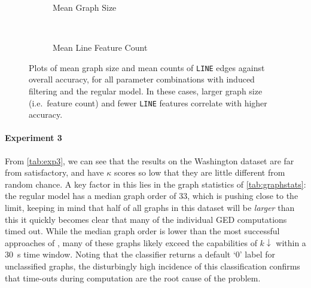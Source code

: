 \documentclass{mpaper}
\begin{document}
\begin{figure}
	\centering	
	
	\begin{subfigure}[t]{0.45\linewidth}
		
		\caption{Mean Graph Size}
	\end{subfigure}
	~
	\begin{subfigure}[t]{0.45\linewidth}
		
		\caption{Mean Line Feature Count}
	\end{subfigure}
	
	\vspace{0.5em}
	\caption{
		Plots of mean graph size and mean counts of \texttt{LINE} edges against overall accuracy, for all parameter combinations with induced filtering and the regular model.
		In these cases, larger graph size (i.e.\ feature count) and fewer \texttt{LINE} features correlate with higher accuracy.
		\label{fig:acc-vs-graphstat}
	}
\end{figure}

\paragraph{Experiment 3}
From \cref{tab:exp3}, we can see that the results on the Washington dataset are far from satisfactory, and have $\kappa$ scores so low that they are little different from random chance.
A key factor in this lies in the graph statistics of \cref{tab:graphstats}: the regular model has a median graph order of 33, which is pushing close to the limit, keeping in mind that half of all graphs in this dataset will be \emph{larger} than this it quickly becomes clear that many of the individual GED computations timed out.
While the median graph order is lower than the most successful approaches of \citeauthor{Graphs-Handwriting}, many of these graphs likely exceed the capabilities of $k\downarrow$ within a \SI{30}{\second} time window.
Noting that the classifier returns a default `0' label for unclassified graphs, the disturbingly high incidence of this classification confirms that time-outs during computation are the root cause of the problem.
\end{document}
